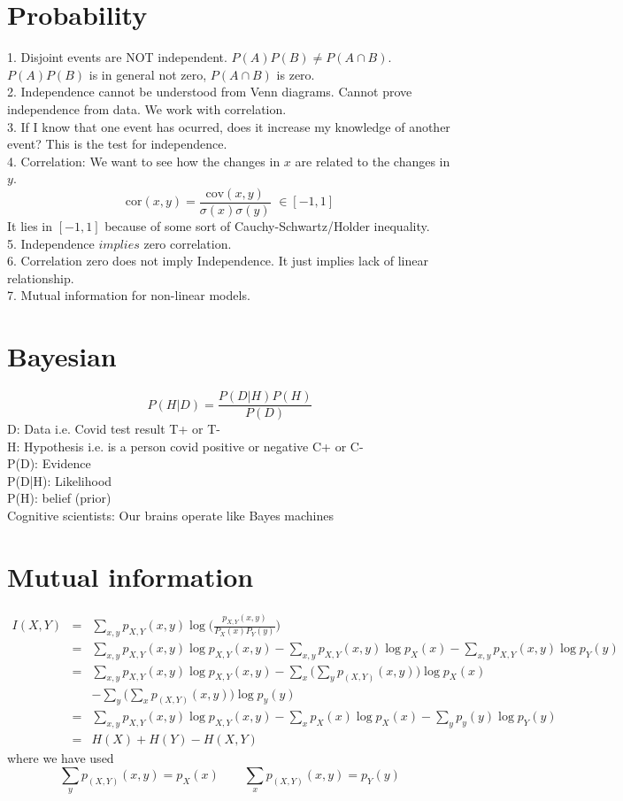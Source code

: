 \documentclass{article}
\newcommand{\beq}{\begin{equation}}
\newcommand{\eeq}{\end{equation}}
\newcommand{\ber}{\begin{eqnarray}}
\newcommand{\eer}{\end{eqnarray}}
\begin{document}
\section{Probability}
1. Disjoint events are NOT independent. $P(A)P(B)\ne{}P(A\cap{B})$. $P(A)P(B)$ is in general not zero, $P(A\cap{B})$ is zero.\\
2. Independence cannot be understood from Venn diagrams. Cannot prove independence from data. We work with correlation. \\
3. If I know that one event has ocurred, does it increase my knowledge of another event? This is the test for independence. \\
4. Correlation: We want to see how the changes in $x$ are related to the changes in $y$.\\
\beq
\text{cor}(x,y) = \frac{\text{cov}(x,y)}{\sigma(x)\sigma(y)}\,\,\in [-1,1] 
\eeq
It lies in $[-1,1]$ because of some sort of Cauchy-Schwartz/Holder inequality.\\
5. Independence $implies$ zero correlation.\\
6. Correlation zero does not imply Independence. It just implies lack of linear relationship.\\
7. Mutual information for non-linear models.
\section{Bayesian}
\beq
P(H|D) = \frac{P(D|H)P(H)}{P(D)}
\eeq
D: Data i.e. Covid test result T+ or T-\\
H: Hypothesis i.e. is a person covid positive or negative C+ or C-\\
P(D): Evidence\\
P(D|H): Likelihood\\
P(H): belief (prior)\\
Cognitive scientists: Our brains operate like Bayes machines
\section{Mutual information}
\ber
I(X,Y) &=& \sum_{x,y}p_{X,Y}(x,y)\log\Big(\frac{p_{X,Y}(x,y)}{P_X(x)P_Y(y)}\Big)\\
&=& \sum_{x,y}p_{X,Y}(x,y)\log{p_{X,Y}(x,y)} - \sum_{x,y}p_{X,Y}(x,y)\log{p_X(x)} - \sum_{x,y}p_{X,Y}(x,y)\log{p_Y(y)} \\
&=& \sum_{x,y}p_{X,Y}(x,y)\log{p_{X,Y}(x,y)} - \sum_{x}\Big(\sum_{y}p_(X,Y)(x,y)\Big)\log{p_X(x)} \nonumber \\ && - \sum_{y}\Big(\sum_{x}p_(X,Y)(x,y)\Big)\log{p_y(y)} \\
&=& \sum_{x,y}p_{X,Y}(x,y)\log{p_{X,Y}(x,y)} - \sum_{x}p_{X}(x)\log{p_X(x)} - \sum_{y}p_{y}(y)\log{p_Y(y)} \\
&=& H(X) + H(Y) - H(X,Y)
\eer
where we have used
\beq
\sum_{y}p_(X,Y)(x,y) = p_{X}(x) \qquad \sum_{x}p_(X,Y)(x,y) = p_{Y}(y)
\eeq
\end{document}
